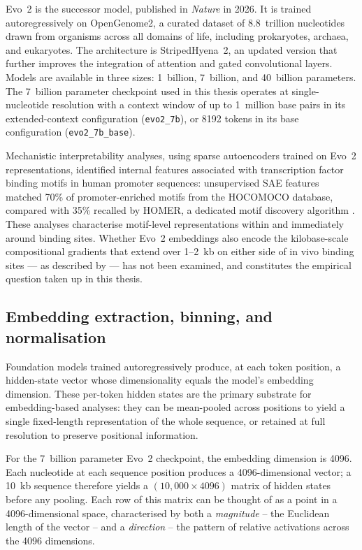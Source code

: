 Evo~2 \cite{brixiGenomeModellingDesign2026} is the successor model, published in
\emph{Nature} in 2026.
It is trained autoregressively on OpenGenome2, a curated dataset of 8.8~trillion nucleotides drawn from organisms across all domains of life, including prokaryotes, archaea, and
eukaryotes.
The architecture is StripedHyena~2, an updated version that further improves the integration
of attention and gated convolutional layers.
Models are available in three sizes:
1~billion, 7~billion, and 40~billion parameters.
The 7~billion parameter checkpoint used in this thesis operates at single-nucleotide
resolution with a context window of up to 1~million base pairs in its extended-context
configuration (\texttt{evo2\_7b}), or 8192 tokens in its base configuration
(\texttt{evo2\_7b\_base}).

Mechanistic interpretability analyses, using sparse autoencoders trained on Evo~2
representations, identified internal features associated with transcription factor binding
motifs in human promoter sequences: unsupervised SAE features matched 70\% of
promoter-enriched motifs from the HOCOMOCO database, compared with 35\% recalled
by HOMER, a dedicated motif discovery algorithm \cite{brixiGenomeModellingDesign2026}.
These analyses characterise motif-level representations within and immediately around
binding sites.
Whether Evo~2 embeddings also encode the kilobase-scale compositional gradients that
extend over 1--2~kb on either side of in vivo binding sites — as described by
\citet{faltejskovaNonconsensusFlankingSequence2026a} — has not been examined,
and constitutes the empirical question taken up in this thesis.
\subsection{Embedding extraction, binning, and normalisation}
\label{sec:embedding-extraction}

Foundation models trained autoregressively produce, at each token position, a hidden-state
vector whose dimensionality equals the model's embedding dimension.
These per-token hidden states are the primary substrate for embedding-based analyses:
they can be mean-pooled across positions to yield a single fixed-length representation of the
whole sequence, or retained at full resolution to preserve positional information.

For the 7~billion parameter Evo~2 checkpoint, the embedding dimension is 4096.
Each nucleotide at each sequence position produces a 4096-dimensional vector;
a 10~kb sequence therefore yields a $(10{,}000 \times 4096)$ matrix of hidden states before
any pooling.
Each row of this matrix can be thought of as a point in a 4096-dimensional space,
characterised by both a \emph{magnitude} -- the Euclidean length of the vector -- and a
\emph{direction} -- the pattern of relative activations across the 4096 dimensions.

